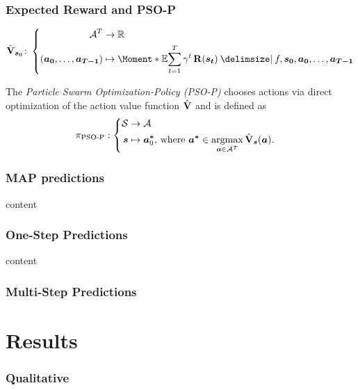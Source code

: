 \begin{frame}
    \frametitle{Expected Reward and PSO-P}

    \begin{align}
        \label{eq:action_value_function}
        \AVlu_{\mat{s_0}} \colon \left\{
            \begin{aligned}
                \Ah^T &\to \R \\
                \left( \mat{a_0}, \dots, \mat{a_{T-1}} \right) &\mapsto \Moment*{\E}{\sum_{t=1}^T \gamma^t \Rwd(\mat{s_t}) \given f, \mat{s_0}, \mat{a_0}, \dots, \mat{a_{T-1}}}
            \end{aligned}
            \right.
        \end{align}

    \begin{definition}[PSO-P]
        \label{def:psop}
        The \emph{Particle Swarm Optimization-Policy (PSO-P)} chooses actions via direct optimization of the action value function $\operatorname{\hat{\operatorname{\mathbf{V}}}}$ and is defined as
        \begin{align}
            \pi_{\text{PSO-P}} &: \left\{
            \begin{aligned}
                \mathcal{S} &\to \mathcal{A}\\
                \bm{s} &\mapsto \bm{a^\ast}_0 \text{, where } \bm{a^\ast} \in \operatorname*{argmax}_{\bm{a} \in \mathcal{A}^T} \operatorname{\hat{\operatorname{\mathbf{V}}}}_{\bm{s}}(\bm{a}).
            \end{aligned}
            \right.
        \end{align}
    \end{definition}
\end{frame}

\begin{frame}
    \frametitle{MAP predictions}

    content
\end{frame}

\begin{frame}
    \frametitle{One-Step Predictions}

    content
\end{frame}

\begin{frame}
    \frametitle{Multi-Step Predictions}

    \centering
\end{frame}

\section{Results}
\begin{frame}
    \frametitle{Qualitative}

\end{frame}

